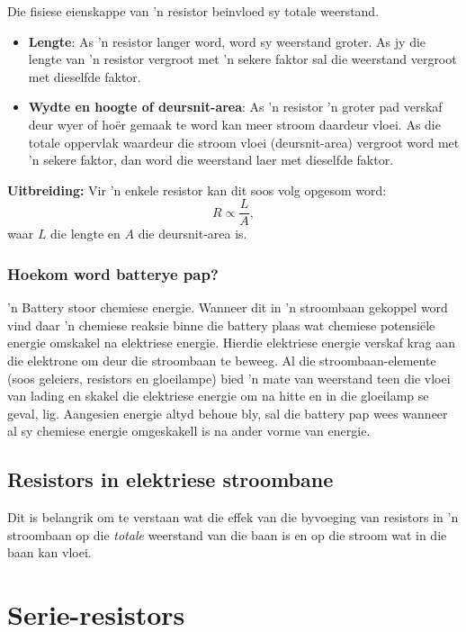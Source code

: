 Die fisiese eienskappe van 'n resistor beinvloed sy totale weerstand.
\begin{itemize}
 \item \textbf{Lengte}: As 'n resistor langer word, word sy weerstand groter.
As jy die lengte van 'n resistor vergroot met 'n sekere faktor sal die
weerstand vergroot met dieselfde faktor.
\item \textbf{Wydte en hoogte of deursnit-area}: As 'n resistor 'n groter pad
verskaf deur wyer of ho\"er gemaak te word kan meer stroom daardeur vloei. As
die totale oppervlak waardeur die stroom vloei (deursnit-area) vergroot word
met 'n sekere faktor, dan word die weerstand laer met dieselfde faktor.
\end{itemize}
\textbf{Uitbreiding:} Vir 'n enkele resistor kan dit soos volg opgesom word:
\begin{equation*}
 R\propto\frac{L}{A},
\end{equation*} waar $L$ die lengte en $A$ die deursnit-area is.

\subsubsection*{Hoekom word batterye pap?}
 'n Battery stoor chemiese energie. Wanneer dit in 'n stroombaan gekoppel word
vind daar 'n chemiese reaksie binne die battery plaas wat chemiese
potensi\"ele energie omskakel na elektriese energie. Hierdie elektriese energie
verskaf krag aan die elektrone om deur die stroombaan te beweeg. Al die
stroombaan-elemente (soos geleiers, resistors en gloeilampe) bied 'n mate van
weerstand teen die vloei van lading en skakel die elektriese energie om na
hitte en in die gloeilamp se geval, lig.
Aangesien energie altyd behoue bly, sal die battery pap wees wanneer al sy
chemiese energie omgeskakell is na ander vorme van energie.

\subsection*{Resistors in elektriese stroombane}
Dit is belangrik om te verstaan wat die effek van die byvoeging van
resistors in 'n stroombaan op die \textit{totale} weerstand van die baan is en
op die stroom wat in die baan kan vloei.


\section{Serie-resistors}

